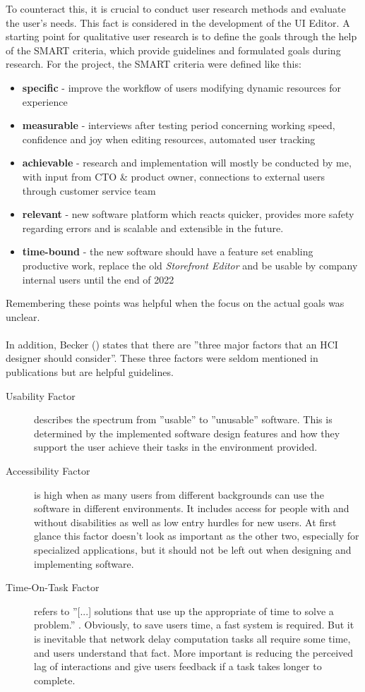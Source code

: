 To counteract this, it is crucial to conduct user research methods and evaluate the user's needs.
This fact is considered in the development of the UI Editor.
A starting point for qualitative user research is to define the goals through the help of the SMART criteria, which provide guidelines and formulated goals during research.
For the project, the SMART criteria were defined like this:
\label{fig:smart}
\begin{itemize}
  \item \textbf{specific} - improve the workflow of users modifying dynamic resources for \Gls{experience}
  \item \textbf{measurable} - interviews after testing period concerning working speed, confidence and joy when editing resources, automated user tracking
  \item \textbf{achievable} - research and implementation will mostly be conducted by me, with input from CTO \& product owner, connections to external users through customer service team
  \item \textbf{relevant} - new software platform which reacts quicker, provides more safety regarding errors and is scalable and extensible in the future.
  \item \textbf{time-bound} - the new software should have a feature set enabling productive work, replace the old \textit{Storefront Editor} and be usable by company internal users until the end of 2022
\end{itemize}
Remembering these points was helpful when the focus on the actual goals was unclear.
\\\\
In addition, Becker (\cite[pp. 37-41]{LearnHCI:2020ys}) states that there are ''three major factors that an HCI designer should consider''.
These three factors were seldom mentioned in publications but are helpful guidelines.
\begin{description}
  \item[Usability Factor] describes the spectrum from ''usable'' to ''unusable'' software. This is determined by the implemented software design features and how they support the user achieve their tasks in the environment provided.
  \item[Accessibility Factor] is high when as many users from different backgrounds can use the software in different environments. 
  It includes access for people with and without disabilities as well as low entry hurdles for new users.
  At first glance this factor doesn't look as important as the other two, especially for specialized applications, but it should not be left out when designing and implementing software.
  \item[Time-On-Task Factor] refers to ''[...] solutions that use up the appropriate of time to solve a problem.'' \Cite[p. 40]{LearnHCI:2020ys}. Obviously, to save users time, a fast system is required.
But it is inevitable that network delay computation tasks all require some time, and users understand that fact. More important is reducing the perceived lag of interactions and give users feedback if a task takes longer to complete.
\end{description}

